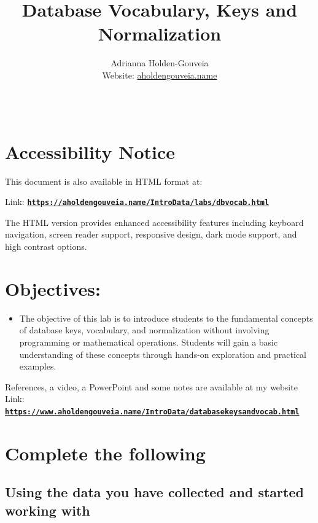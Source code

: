 \documentclass[12pt]{article}
\title{Database Vocabulary, Keys and Normalization}
\author{
        Adrianna Holden-Gouveia \\
        Website: \href{https://aholdengouveia.name}{aholdengouveia.name}\\ 
        \date{\vspace{-5ex}}
        \faGithub {: aholdengouveia} \\
        }
\begin{document}
    

\maketitle



\section*{Accessibility Notice}
This document is also available in HTML format at:

Link: \href{https://aholdengouveia.name/IntroData/labs/dbvocab.html}{\textbf{\nolinkurl{https://aholdengouveia.name/IntroData/labs/dbvocab.html}}}

The HTML version provides enhanced accessibility features including keyboard navigation, screen reader support, responsive design, dark mode support, and high contrast options.

\section*{Objectives:}
\begin{itemize}
    \item The objective of this lab is to introduce students to the fundamental concepts of database keys, vocabulary, and normalization without involving programming or mathematical operations. Students will gain a basic understanding of these concepts through hands-on exploration and practical examples.
\end{itemize}

References, a video, a PowerPoint and some notes are available at my website Link: \href{https://www.aholdengouveia.name/IntroData/databasekeysandvocab.html}{\textbf{\nolinkurl{https://www.aholdengouveia.name/IntroData/databasekeysandvocab.html}}}


\section*{Complete the following}


\subsection*{Using the data you have collected and started working with}
\end{document}
